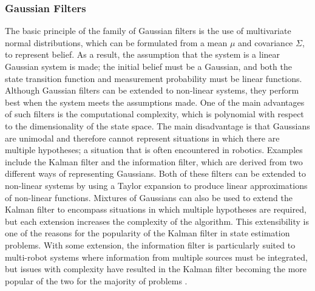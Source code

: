 \documentclass[conference]{IEEEtran}
\begin{document}
\subsubsection{Gaussian Filters}
The basic principle of the family of Gaussian filters is the use of multivariate normal distributions, which can be formulated from a mean $\mu$ and covariance $\Sigma$, to represent belief. As a result, the assumption that the system is a linear Gaussian system is made; the initial belief must be a Gaussian, and both the state transition function and measurement probability must be linear functions. Although Gaussian filters can be extended to non-linear systems, they perform best when the system meets the assumptions made. One of the main advantages of such filters is the computational complexity, which is polynomial with respect to the dimensionality of the state space. The main disadvantage is that Gaussians are unimodal and therefore cannot represent situations in which there are multiple hypotheses; a situation that is often encountered in robotics. Examples include the Kalman filter and the information filter, which are derived from two different ways of representing Gaussians. Both of these filters can be extended to non-linear systems by using a Taylor expansion to produce linear approximations of non-linear functions. Mixtures of Gaussians can also be used to extend the Kalman filter to encompass situations in which multiple hypotheses are required, but each extension increases the complexity of the algorithm. This extensibility is one of the reasons for the popularity of the Kalman filter in state estimation problems. With some extension, the information filter is particularly suited to multi-robot systems where information from multiple sources must be integrated, but issues with complexity have resulted in the Kalman filter becoming the more popular of the two for the majority of problems \cite{thrun}.
\end{document}
